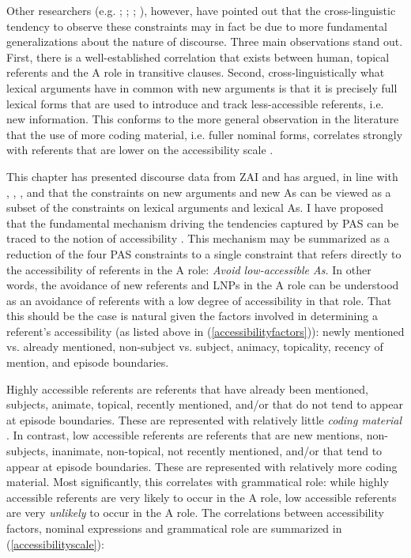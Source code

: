 
Other researchers (e.g. \citealt{haspelmath2006}; \citealt{everett2009}; \citealt{haig2016}; \citealt{schnell2017}), however, have pointed out that the cross-linguistic tendency to observe these constraints may in fact be due to more fundamental generalizations about the nature of discourse. Three main observations stand out. First, there is a well-established correlation that exists between human, topical referents and the A role in transitive clauses. Second, cross-linguistically what lexical arguments have in common with new arguments is that it is precisely full lexical forms that are used to introduce and track less-accessible \citep{ariel1990} referents, i.e. new information. This conforms to the more general observation in the literature that the use of more coding material, i.e. fuller nominal forms, correlates strongly with referents that are lower on the accessibility scale \citep{givon1983}. 

This chapter has presented discourse data from ZAI and has argued, in line with \citet{haspelmath2006}, \citet{everett2009}, \citet{haig2016}, and \citet{schnell2017} that the constraints on new arguments and new As can be viewed as a subset of the constraints on lexical arguments and lexical As. I have proposed that the fundamental mechanism driving the tendencies captured by PAS can be traced to the notion of accessibility \citep{ariel1990,ariel2001}. This mechanism may be summarized as a reduction of the four PAS constraints to a single constraint that refers directly to the accessibility of referents in the A role: \textit{Avoid low-accessible As.} In other words, the avoidance of new referents and LNPs in the A role can be understood as an avoidance of referents with a low degree of accessibility in that role. That this should be the case is natural given the factors involved in determining a referent's accessibility (as listed above in (\ref{accessibilityfactors})): newly mentioned vs. already mentioned, non-subject vs. subject, animacy, topicality, recency of mention, and episode boundaries. 

Highly accessible referents are referents that have already been mentioned, subjects, animate, topical, recently mentioned, and/or that do not tend to appear at episode boundaries. These are represented with relatively little \textit{coding material} \citep{givon1983}. In contrast, low accessible referents are referents that are new mentions, non-subjects, inanimate, non-topical, not recently mentioned, and/or that tend to appear at episode boundaries. These are represented with relatively more coding material. Most significantly, this correlates with grammatical role: while highly accessible referents are very likely to occur in the A role, low accessible referents are very \textit{unlikely} to occur in the A role. The correlations between accessibility factors, nominal expressions and grammatical role are summarized in (\ref{accessibilityscale}):


